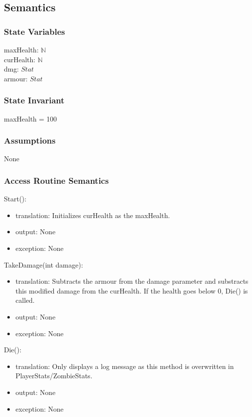 \documentclass[12pt]{article}
\begin{document}
\subsection* {Semantics}

\subsubsection* {State Variables}

maxHealth: $\mathbb{N}$ \\
curHealth: $\mathbb{N}$ \\
dmg: $Stat$\\
armour: $Stat$\\

\subsubsection* {State Invariant}

maxHealth = 100

\subsubsection* {Assumptions}

None

\subsubsection* {Access Routine Semantics}

\noindent Start():
\begin{itemize}
\item translation: Initializes curHealth as the maxHealth.
\item output: None
\item exception: None
\end{itemize}

\noindent TakeDamage(int damage):
\begin{itemize}
\item translation: Subtracts the armour from the damage parameter and substracts this modified damage from the curHealth. If the health goes below 0, Die() is called.
\item output: None
\item exception: None
\end{itemize}

\noindent Die():
\begin{itemize}
\item translation: Only displays a log message as this method is overwritten in PlayerStats/ZombieStats.
\item output: None
\item exception: None
\end{itemize}
\end{document}
